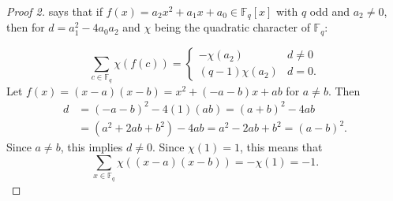 \documentclass{article}
\newcommand{\F}{\mathbb F}
\theoremstyle{definition}
\numberwithin{equation}{section}
\begin{document}
\begin{proof}[Proof 2]
\cite[Theorem 5.48]{LidlNiederreiterFiniteFields} says that if $f(x) = a_2x^2+a_1x+a_0 \in \F_q[x]$ with $q$ odd and $a_2 \neq 0$, then for $d=a_1^2-4a_0a_2$ and $\chi$ being the quadratic character of $\F_q$:

$$\sum_{c \in \F_q} \chi(f(c)) =
\begin{cases}
-\chi(a_2) & d\neq 0\\
(q-1)\chi(a_2) & d=0.
\end{cases}
$$
Let $f(x) = (x-a)(x-b) = x^2+(-a-b)x+ab$ for $a \neq b$. Then
\begin{align*}
    d&=(-a-b)^2-4(1)(ab) = (a+b)^2-4ab\\
    &=(a^2+2ab+b^2) - 4ab = a^2-2ab+b^2=(a-b)^2.
\end{align*}
Since $a \neq b$, this implies $d \neq 0$. Since \(\chi(1)=1\), this means that
\[
\sum_{x \in \F_q} \chi((x-a)(x-b)) = -\chi(1) = -1.
\]

\end{proof}






\end{document}
